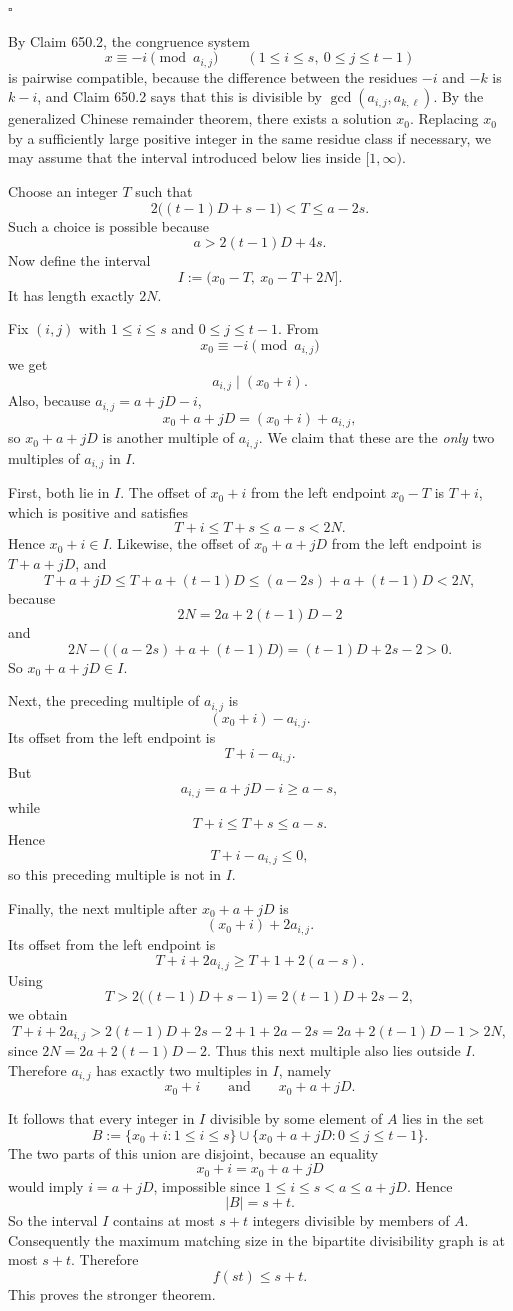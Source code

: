 \hfill$\square$

By Claim 650.2, the congruence system
\[
 x\equiv -i \pmod{a_{i,j}}
 \qquad (1\le i\le s,\ 0\le j\le t-1)
\]
is pairwise compatible, because the difference between the residues $-i$ and $-k$ is $k-i$, and Claim 650.2 says that this is divisible by $\gcd(a_{i,j},a_{k,\ell})$.
By the generalized Chinese remainder theorem, there exists a solution $x_0$.
Replacing $x_0$ by a sufficiently large positive integer in the same residue class if necessary, we may assume that the interval introduced below lies inside $[1,\infty)$.

Choose an integer $T$ such that
\[
 2\bigl((t-1)D+s-1\bigr)<T\le a-2s.
\]
Such a choice is possible because
\[
 a>2(t-1)D+4s.
\]
Now define the interval
\[
 I:=(x_0-T,\ x_0-T+2N].
\]
It has length exactly $2N$.

Fix $(i,j)$ with $1\le i\le s$ and $0\le j\le t-1$.
From
\[
 x_0\equiv -i \pmod{a_{i,j}}
\]
we get
\[
 a_{i,j}\mid (x_0+i).
\]
Also, because $a_{i,j}=a+jD-i$,
\[
 x_0+a+jD=(x_0+i)+a_{i,j},
\]
so $x_0+a+jD$ is another multiple of $a_{i,j}$.
We claim that these are the \emph{only} two multiples of $a_{i,j}$ in $I$.

First, both lie in $I$.
The offset of $x_0+i$ from the left endpoint $x_0-T$ is $T+i$, which is positive and satisfies
\[
 T+i\le T+s\le a-s<2N.
\]
Hence $x_0+i\in I$.
Likewise, the offset of $x_0+a+jD$ from the left endpoint is $T+a+jD$, and
\[
 T+a+jD
 \le T+a+(t-1)D
 \le (a-2s)+a+(t-1)D
 <2N,
\]
because
\[
 2N=2a+2(t-1)D-2
\]
and
\[
 2N-\bigl((a-2s)+a+(t-1)D\bigr)=(t-1)D+2s-2>0.
\]
So $x_0+a+jD\in I$.

Next, the preceding multiple of $a_{i,j}$ is
\[
 (x_0+i)-a_{i,j}.
\]
Its offset from the left endpoint is
\[
 T+i-a_{i,j}.
\]
But
\[
 a_{i,j}=a+jD-i\ge a-s,
\]
while
\[
 T+i\le T+s\le a-s.
\]
Hence
\[
 T+i-a_{i,j}\le 0,
\]
so this preceding multiple is not in $I$.

Finally, the next multiple after $x_0+a+jD$ is
\[
 (x_0+i)+2a_{i,j}.
\]
Its offset from the left endpoint is
\[
 T+i+2a_{i,j}
 \ge T+1+2(a-s).
\]
Using
\[
 T>2\bigl((t-1)D+s-1\bigr)=2(t-1)D+2s-2,
\]
we obtain
\[
 T+i+2a_{i,j}
 >2(t-1)D+2s-2+1+2a-2s
 =2a+2(t-1)D-1
 >2N,
\]
since $2N=2a+2(t-1)D-2$.
Thus this next multiple also lies outside $I$.
Therefore $a_{i,j}$ has exactly two multiples in $I$, namely
\[
 x_0+i
 \qquad\text{and}\qquad
 x_0+a+jD.
\]

It follows that every integer in $I$ divisible by some element of $A$ lies in the set
\[
 B:=\{x_0+i:1\le i\le s\}\cup\{x_0+a+jD:0\le j\le t-1\}.
\]
The two parts of this union are disjoint, because an equality
\[
 x_0+i=x_0+a+jD
\]
would imply $i=a+jD$, impossible since $1\le i\le s<a\le a+jD$.
Hence
\[
 |B|=s+t.
\]
So the interval $I$ contains at most $s+t$ integers divisible by members of $A$.
Consequently the maximum matching size in the bipartite divisibility graph is at most $s+t$.
Therefore
\[
 f(st)\le s+t.
\]
This proves the stronger theorem.

